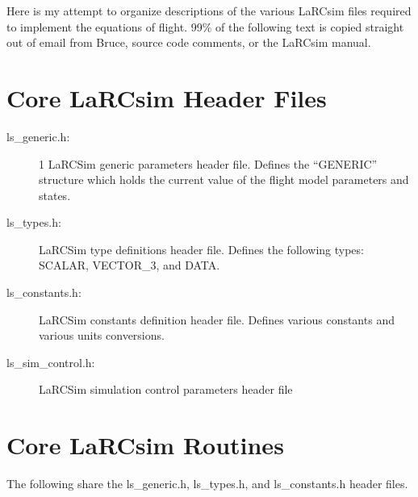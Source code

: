\documentclass[12pt,titlepage]{article}
\begin{document}
Here is my attempt to organize descriptions of the various LaRCsim
files required to implement the equations of flight.  99\% of the
following text is copied straight out of email from Bruce, source code
comments, or the LaRCsim manual.

\section{Core LaRCsim Header Files}

\begin{description}
  \item[ls\_generic.h:]1 LaRCSim generic parameters header file.  Defines
    the ``GENERIC'' structure which holds the current value of the
    flight model parameters and states.

  \item[ls\_types.h:] LaRCSim type definitions header file.  Defines
    the following types: SCALAR, VECTOR\_3, and DATA.

  \item[ls\_constants.h:] LaRCSim constants definition header file.
    Defines various constants and various units conversions.
    
  \item[ls\_sim\_control.h:] LaRCSim simulation control parameters
    header file
\end{description}


\section{Core LaRCsim Routines}

The following share the ls\_generic.h, ls\_types.h, and ls\_constants.h
header files.
\end{document}
